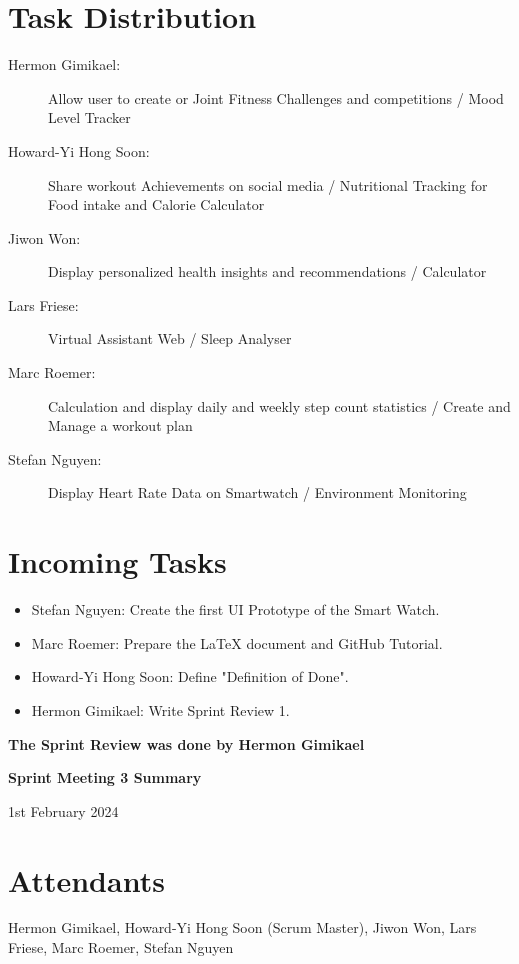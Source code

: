 \documentclass{article}
\begin{document}
\section*{Task Distribution}
\begin{description}
    \item[Hermon Gimikael:] Allow user to create or Joint Fitness Challenges and competitions / Mood Level Tracker
    \item[Howard-Yi Hong Soon:] Share workout Achievements on social media / Nutritional Tracking for Food intake and Calorie Calculator
    \item[Jiwon Won:] Display personalized health insights and recommendations / Calculator
    \item[Lars Friese:] Virtual Assistant Web / Sleep Analyser
    \item[Marc Roemer:] Calculation and display daily and weekly step count statistics / Create and Manage a workout plan
    \item[Stefan Nguyen:] Display Heart Rate Data on Smartwatch / Environment Monitoring
\end{description}

\section*{Incoming Tasks}
\begin{itemize}
    \item Stefan Nguyen: Create the first UI Prototype of the Smart Watch.
    \item Marc Roemer: Prepare the LaTeX document and GitHub Tutorial.
    \item Howard-Yi Hong Soon: Define "Definition of Done".
    \item Hermon Gimikael: Write Sprint Review 1.
\end{itemize}
\noindent
\textbf{The Sprint Review was done by Hermon Gimikael}
\newpage


\begin{center}
    {\Large \textbf{Sprint Meeting 3 Summary}}
    
    \vspace{0.5cm}
    
    {\large 1st February 2024}
\end{center}

\section*{Attendants}
Hermon Gimikael, Howard-Yi Hong Soon (Scrum Master), Jiwon Won, Lars Friese, Marc Roemer, Stefan Nguyen
\end{document}
